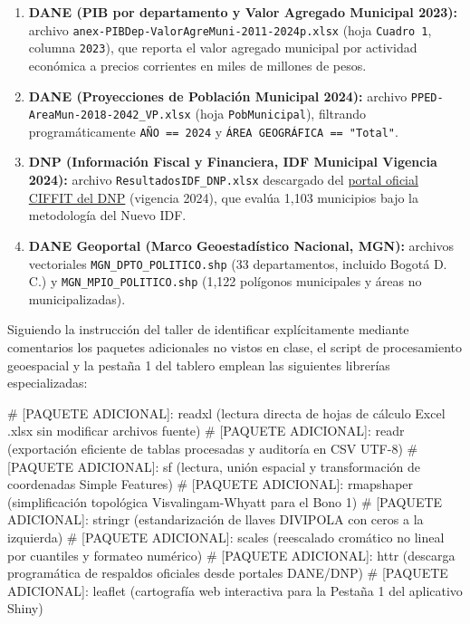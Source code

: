 \documentclass[
  10pt,
  letterpaper,
  DIV=11,
  numbers=noendperiod]{scrartcl}
\newenvironment{Shaded}{\begin{snugshade}}{\end{snugshade}}
\newcommand{\CommentTok}[1]{\textcolor[rgb]{0.37,0.37,0.37}{#1}}
\providecommand{\tightlist}{%
  \setlength{\itemsep}{0pt}\setlength{\parskip}{0pt}}
\begin{document}
\begin{enumerate}
\def\labelenumi{\arabic{enumi}.}
\tightlist
\item
  \textbf{DANE (PIB por departamento y Valor Agregado Municipal 2023):}
  archivo \texttt{anex-PIBDep-ValorAgreMuni-2011-2024p.xlsx} (hoja
  \texttt{Cuadro\ 1}, columna \texttt{2023}), que reporta el valor
  agregado municipal por actividad económica a precios corrientes en
  miles de millones de pesos.
\item
  \textbf{DANE (Proyecciones de Población Municipal 2024):} archivo
  \texttt{PPED-AreaMun-2018-2042\_VP.xlsx} (hoja \texttt{PobMunicipal}),
  filtrando programáticamente \texttt{AÑO\ ==\ 2024} y
  \texttt{ÁREA\ GEOGRÁFICA\ ==\ "Total"}.
\item
  \textbf{DNP (Información Fiscal y Financiera, IDF Municipal Vigencia
  2024):} archivo \texttt{ResultadosIDF\_DNP.xlsx} descargado del
  \href{https://ciffit.dnp.gov.co/CIFFIT/ConsultasIDF}{portal oficial
  CIFFIT del DNP} (vigencia 2024), que evalúa 1,103 municipios bajo la
  metodología del Nuevo IDF.
\item
  \textbf{DANE Geoportal (Marco Geoestadístico Nacional, MGN):} archivos
  vectoriales \texttt{MGN\_DPTO\_POLITICO.shp} (33 departamentos,
  incluido Bogotá D. C.) y \texttt{MGN\_MPIO\_POLITICO.shp} (1,122
  polígonos municipales y áreas no municipalizadas).
\end{enumerate}

Siguiendo la instrucción del taller de identificar explícitamente
mediante comentarios los paquetes adicionales no vistos en clase, el
script de procesamiento geoespacial y la pestaña 1 del tablero emplean
las siguientes librerías especializadas:

\begin{Shaded}
\begin{Highlighting}[]
\CommentTok{\# [PAQUETE ADICIONAL]: readxl (lectura directa de hojas de cálculo Excel .xlsx sin modificar archivos fuente)}
\CommentTok{\# [PAQUETE ADICIONAL]: readr (exportación eficiente de tablas procesadas y auditoría en CSV UTF{-}8)}
\CommentTok{\# [PAQUETE ADICIONAL]: sf (lectura, unión espacial y transformación de coordenadas Simple Features)}
\CommentTok{\# [PAQUETE ADICIONAL]: rmapshaper (simplificación topológica Visvalingam{-}Whyatt para el Bono 1)}
\CommentTok{\# [PAQUETE ADICIONAL]: stringr (estandarización de llaves DIVIPOLA con ceros a la izquierda)}
\CommentTok{\# [PAQUETE ADICIONAL]: scales (reescalado cromático no lineal por cuantiles y formateo numérico)}
\CommentTok{\# [PAQUETE ADICIONAL]: httr (descarga programática de respaldos oficiales desde portales DANE/DNP)}
\CommentTok{\# [PAQUETE ADICIONAL]: leaflet (cartografía web interactiva para la Pestaña 1 del aplicativo Shiny)}
\end{Highlighting}
\end{Shaded}
\end{document}
